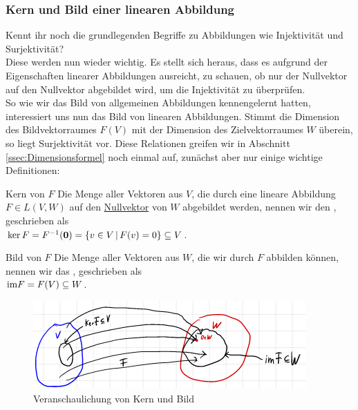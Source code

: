 \subsubsection{Kern und Bild einer linearen Abbildung}\label{sssec:12KernBildDefinition}
Kennt ihr noch die grundlegenden Begriffe zu Abbildungen wie Injektivität und Surjektivität?\\
Diese werden nun wieder wichtig. Es stellt sich heraus, dass es aufgrund der Eigenschaften linearer Abbildungen ausreicht, zu schauen, ob nur der Nullvektor auf den Nullvektor abgebildet wird, um die Injektivität zu überprüfen.\\
So wie wir das Bild von allgemeinen Abbildungen kennengelernt hatten, interessiert uns nun das Bild von linearen Abbildungen. Stimmt die Dimension des Bildvektorraumes $F(V)$ mit der Dimension des Zielvektorraumes $W$ überein, so liegt Surjektivität vor. Diese Relationen greifen wir in Abschnitt \ref{ssec:Dimensionsformel} noch einmal auf, zunächst aber nur einige wichtige Definitionen:
\begin{Def}
{Kern von $F$}
Die Menge aller Vektoren aus $V$, die durch eine lineare Abbildung $F\in L(V,W)$ auf den \underline{Nullvektor} von $W$ abgebildet werden, nennen wir den , geschrieben als\\
$\ker F= F^{-1}({\text{\boldmath${0}$}})=\{v\in V\,|\, F(v)=0\}\subseteq V$.
\end{Def}
\begin{Def}
{Bild von $F$}
Die Menge aller Vektoren aus $W$, die wir durch $F$ abbilden können, nennen wir das , geschrieben als\\
$\text{im} F=F(V)\subseteq W$.
\end{Def}
\begin{figure}[htbp]
\centering
\includegraphics[width=.5\textwidth]{Dateien/00/12KernBild.PNG}
\caption*{Veranschaulichung von Kern und Bild}
\end{figure}
